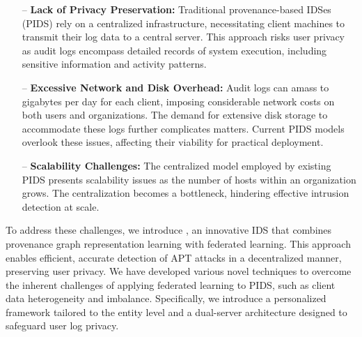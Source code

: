 \begin{itemize} [leftmargin=*]
    \item[--] \textbf{Lack of Privacy Preservation:} Traditional provenance-based IDSes (PIDS)  rely on a centralized infrastructure, necessitating client machines to transmit their log data to a central server.  This approach risks user privacy as audit logs encompass detailed records of system execution, including sensitive information and activity patterns.
    
    \item[--] \textbf{Excessive Network and Disk Overhead:} Audit logs can amass to gigabytes per day for each client, imposing considerable network costs on both users and organizations. The demand for extensive disk storage to accommodate these logs further complicates matters. Current PIDS models overlook these issues, affecting their viability for practical deployment.  
    
    \item[--] \textbf{Scalability Challenges:} The centralized model employed by existing PIDS presents scalability issues as the number of hosts within an organization grows. The centralization becomes a bottleneck, hindering effective intrusion detection at scale. 
\end{itemize}

To address these challenges, we introduce \Sys, an innovative IDS that combines provenance graph representation learning with federated learning. This approach enables efficient, accurate detection of APT attacks in a decentralized manner, preserving user privacy. We have developed various novel techniques to overcome the inherent challenges of applying federated learning to PIDS, such as client data heterogeneity and imbalance. Specifically, we introduce a personalized \gnnshort framework tailored to the entity level and a dual-server architecture designed to safeguard user log privacy.






